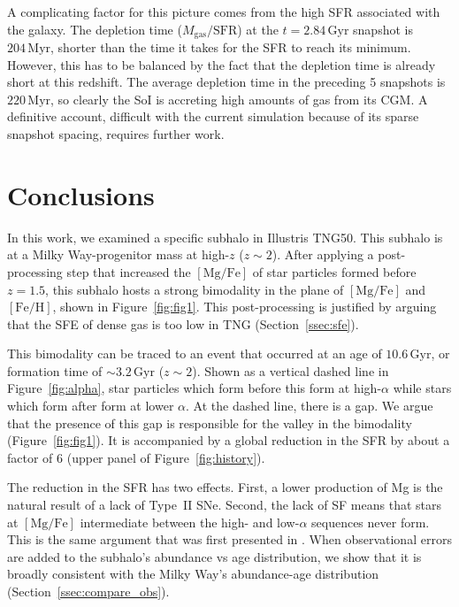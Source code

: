 \documentclass[linenumbers, twocolumn]{aastex631}
\newcommand{\Gyr}{\ensuremath{\textrm{Gyr}}}
\newcommand{\Myr}{\ensuremath{\textrm{Myr}}}
\newcommand{\FeH}{\ensuremath{[\textrm{Fe}/\textrm{H}]}}
\newcommand{\MgFe}{\ensuremath{[\textrm{Mg}/\textrm{Fe}]}}
\begin{document}
A complicating factor for this picture comes from the high SFR associated with the galaxy. The depletion time ($M_{\textrm{gas}}/\textrm{SFR}$) at the $t=2.84\,\Gyr$ snapshot is $204\,\Myr$, shorter than the time it takes for the SFR to reach its minimum. However, this has to be balanced by the fact that the depletion time is already short at this redshift. The average depletion time in the preceding 5 snapshots is $220\,\Myr$, so clearly the SoI is accreting high amounts of gas from its CGM. A definitive account, difficult with the current simulation because of its sparse snapshot spacing, requires further work.


\section{Conclusions}\label{sec:conc}
In this work, we examined a specific subhalo in Illustris TNG50. This subhalo is at a Milky Way-progenitor mass at high-$z$ ($z\sim2$). After applying a post-processing step that increased the \MgFe{} of star particles formed before $z=1.5$, this subhalo hosts a strong bimodality in the plane of \MgFe{} and \FeH{}, shown in Figure~\ref{fig:fig1}. This post-processing is justified by arguing that the SFE of dense gas is too low in TNG (Section~\ref{ssec:sfe}).

This bimodality can be traced to an event that occurred at an age of $10.6\,\Gyr$, or formation time of $\sim3.2\,\Gyr$ ($z\sim2$). Shown as a vertical dashed line in Figure~\ref{fig:alpha}, star particles which form before this form at high-$\alpha$ while stars which form after form at lower $\alpha$. At the dashed line, there is a gap. We argue that the presence of this gap is responsible for the valley in the bimodality (Figure~\ref{fig:fig1}). It is accompanied by a global reduction in the SFR by about a factor of 6 (upper panel of Figure~\ref{fig:history}).

The reduction in the SFR has two effects. First, a lower production of Mg is the natural result of a lack of Type~II SNe. Second, the lack of SF means that stars at \MgFe{} intermediate between the high- and low-$\alpha$ sequences never form. This is the same argument that was first presented in \citet{2024arXiv240707985B}. When observational errors are added to the subhalo's abundance vs age distribution, we show that it is broadly consistent with the Milky Way's abundance-age distribution (Section~\ref{ssec:compare_obs}).
\end{document}
